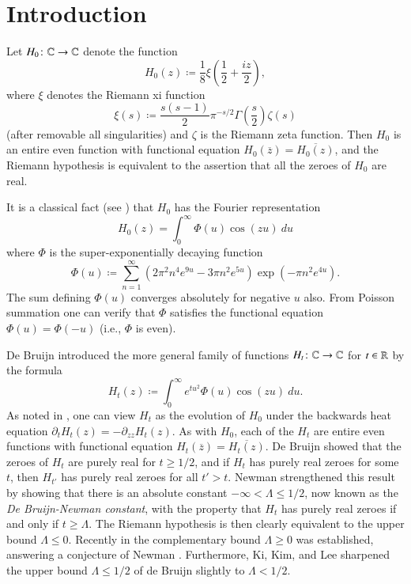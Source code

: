 \section{Introduction}

Let $H_0 \colon \mathbb{C} \to \mathbb{C}$ denote the function
\begin{equation}\label{hoz}
 H_0(z) \coloneqq \frac{1}{8} \xi\left(\frac{1}{2} + \frac{iz}{2}\right),
\end{equation}
where $\xi$ denotes the Riemann xi function
\begin{equation}\label{sas}
 \xi(s) \coloneqq \frac{s(s-1)}{2} \pi^{-s/2} \Gamma\left(\frac{s}{2}\right) \zeta(s)
\end{equation}
(after removable all singularities) and $\zeta$ is the Riemann zeta function.
Then $H_0$ is an entire even function with functional equation $H_0(\overline{z}) = \overline{H_0(z)}$, and the Riemann hypothesis is equivalent to the assertion that all the zeroes of $H_0$ are real.

It is a classical fact (see \cite[p. 255]{titch}) that $H_0$ has the Fourier representation
$$ H_0(z) = \int_0^\infty \Phi(u) \cos(zu)\ du$$
where $\Phi$ is the super-exponentially decaying function
\begin{equation}\label{phidef}
 \Phi(u) \coloneqq \sum_{n=1}^\infty (2\pi^2  n^4 e^{9u} - 3\pi n^2 e^{5u} ) \exp(-\pi n^2 e^{4u} ).
\end{equation}
The sum defining $\Phi(u)$ converges absolutely for negative $u$ also.  From Poisson summation one can verify that $\Phi$ satisfies the functional equation $\Phi(u) = \Phi(-u)$ (i.e., $\Phi$ is even).

De Bruijn \cite{debr} introduced the more general family of functions $H_t \colon \mathbb{C} \to \mathbb{C}$ for $t \in \mathbb{R}$ by the formula
\begin{equation}\label{htdef}
 H_t(z) \coloneqq \int_0^\infty e^{tu^2} \Phi(u) \cos(zu)\ du.
\end{equation}
As noted in \cite[p.114]{csv}, one can view $H_t$ as the evolution of $H_0$ under the backwards heat equation $\partial_t H_t(z)= -\partial_{zz} H_t(z)$.
As with $H_0$, each of the $H_t$ are entire even functions with functional equation $H_t(\overline{z}) = \overline{H_t(z)}$.  De Bruijn showed that the zeroes of $H_t$ are purely real for $t \geq 1/2$, and if $H_t$ has purely real zeroes for some $t$, then $H_{t'}$ has purely real zeroes for all $t'>t$.  Newman \cite{newman} strengthened this result by showing that there is an absolute constant $-\infty < \Lambda \leq 1/2$, now known as the \emph{De Bruijn-Newman constant}, with the property that $H_t$ has purely real zeroes if and only if $t \geq \Lambda$.  The Riemann hypothesis is then clearly equivalent to the upper bound $\Lambda \leq 0$.  Recently in \cite{brad} the complementary bound $\Lambda \geq 0$ was established, answering a conjecture of Newman \cite{newman}.  Furthermore, Ki, Kim, and Lee \cite{kkl} sharpened the upper bound $\Lambda \leq 1/2$ of de Bruijn \cite{debr} slightly to $\Lambda < 1/2$.  

